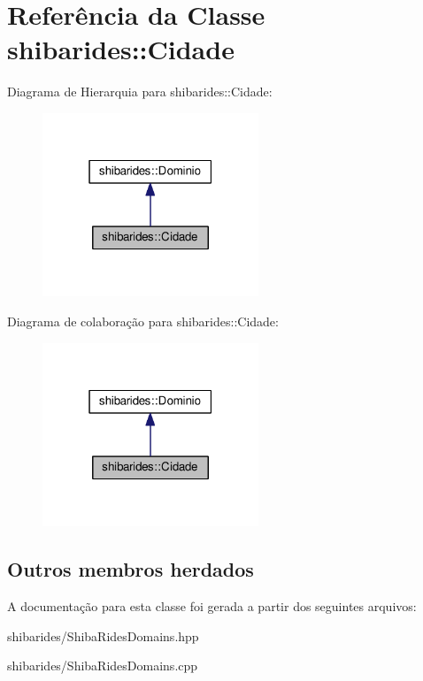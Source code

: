 \hypertarget{classshibarides_1_1Cidade}{}\section{Referência da Classe shibarides\+:\+:Cidade}
\label{classshibarides_1_1Cidade}


Diagrama de Hierarquia para shibarides\+:\+:Cidade\+:\nopagebreak
\begin{figure}[H]
\begin{center}
\leavevmode
\includegraphics[width=183pt]{classshibarides_1_1Cidade__inherit__graph}
\end{center}
\end{figure}


Diagrama de colaboração para shibarides\+:\+:Cidade\+:\nopagebreak
\begin{figure}[H]
\begin{center}
\leavevmode
\includegraphics[width=183pt]{classshibarides_1_1Cidade__coll__graph}
\end{center}
\end{figure}
\subsection*{Outros membros herdados}


A documentação para esta classe foi gerada a partir dos seguintes arquivos\+:\begin{DoxyCompactItemize}
\item 
shibarides/Shiba\+Rides\+Domains.\+hpp\item 
shibarides/Shiba\+Rides\+Domains.\+cpp\end{DoxyCompactItemize}
